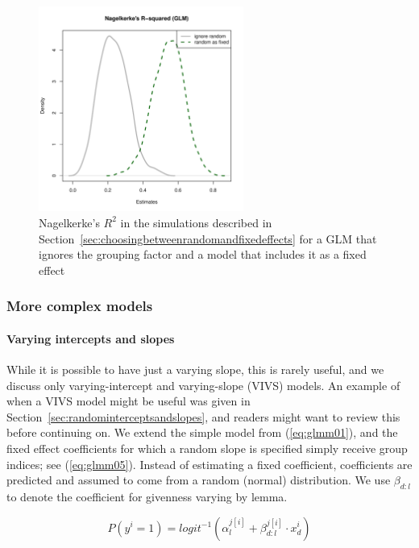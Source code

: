 \begin{figure}[!htpb]
  \centering
  \includegraphics[width=0.6\textwidth]{graphics/rsqglmj5i20}
  \caption{Nagelkerke's $R^2$ in the simulations described in Section~\ref{sec:choosingbetweenrandomandfixedeffects} for a GLM that ignores the grouping factor and a model that includes it as a fixed effect}
  \label{fig:rsqglmj5i20}
\end{figure}

\subsubsection{More complex models}
\label{sec:morecomplexmodels}


\paragraph{Varying intercepts and slopes}

While it is possible to have just a varying slope, this is rarely useful, and we discuss only varying-intercept and varying-slope (VIVS) models.
An example of when a VIVS model might be useful was given in Section~\ref{sec:randominterceptsandslopes}, and readers might want to review this before continuing on.
We extend the simple model from (\ref{eq:glmm01}), and the fixed effect coefficients for which a random slope is specified simply receive group indices; see (\ref{eq:glmm05}).
Instead of estimating a fixed coefficient, coefficients are predicted and assumed to come from a random (normal) distribution.
We use $\beta_{d:l}$ to denote the coefficient for givenness varying by lemma.

\begin{equation}
  P(y^i=1)=logit^{-1}(\alpha_{l}^{j[i]}+\beta_{d:l}^{j[i]}\cdot x_d^i)
  \label{eq:glmm05}
\end{equation}

